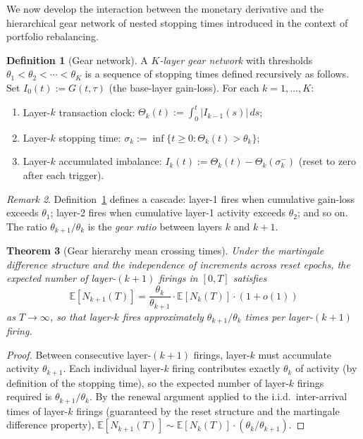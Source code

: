 \documentclass[twocolumn,11pt,a4paper]{article}
\theoremstyle{thmstyle}
\newtheorem{theorem}{Theorem}[section]
\theoremstyle{definition}
\newtheorem{definition}[theorem]{Definition}
\theoremstyle{remark}
\newtheorem{remark}[theorem]{Remark}
\newcommand{\Gain}{G}                        %
\newcommand{\Clock}{\Theta}                  %
\newcommand{\Expect}{\mathbb{E}}
\begin{document}
We now develop the interaction between the monetary
derivative and the hierarchical gear network of nested
stopping times introduced in the context of portfolio
rebalancing.

\begin{definition}[Gear network]\label{def:gear}
A \emph{$K$-layer gear network} with thresholds
$\theta_{1}<\theta_{2}<\cdots<\theta_{K}$ is a sequence
of stopping times defined recursively as follows.  Set
$I_{0}(t) := \Gain(t,\tau)$ (the base-layer gain-loss).
For each $k=1,\ldots,K$:
\begin{enumerate}[nosep,label=(\roman*)]
\item Layer-$k$ transaction clock:
$\Clock_{k}(t) := \int_{0}^{t}|I_{k-1}(s)|\,ds$;
\item Layer-$k$ stopping time:
$\sigma_{k} := \inf\{t\geq 0 : \Clock_{k}(t) > \theta_{k}\}$;
\item Layer-$k$ accumulated imbalance:
$I_{k}(t) := \Clock_{k}(t) - \Clock_{k}(\sigma_{k}^{-})$
(reset to zero after each trigger).
\end{enumerate}
\end{definition}

\begin{remark}\label{rem:gear-hierarchy}
Definition~\ref{def:gear} defines a cascade: layer-1 fires
when cumulative gain-loss exceeds $\theta_{1}$; layer-2
fires when cumulative layer-1 activity exceeds $\theta_{2}$;
and so on.  The ratio $\theta_{k+1}/\theta_{k}$ is the
\emph{gear ratio} between layers $k$ and $k+1$.
\end{remark}

\begin{theorem}[Gear hierarchy mean crossing times]
\label{thm:gear-crossing}
Under the martingale difference structure and the
independence of increments across reset epochs,
the expected number of layer-$(k+1)$ firings in $[0,T]$
satisfies
\begin{equation}\label{eq:gear-frequency}
  \Expect[N_{k+1}(T)] = \frac{\theta_{k}}{\theta_{k+1}}
                         \cdot\Expect[N_{k}(T)]
                         \cdot(1+o(1))
\end{equation}
as $T\to\infty$, so that layer-$k$ fires approximately
$\theta_{k+1}/\theta_{k}$ times per layer-$(k+1)$ firing.
\end{theorem}

\begin{proof}
Between consecutive layer-$(k+1)$ firings, layer-$k$ must
accumulate activity $\theta_{k+1}$.  Each individual
layer-$k$ firing contributes exactly $\theta_{k}$ of
activity (by definition of the stopping time), so the
expected number of layer-$k$ firings required is
$\theta_{k+1}/\theta_{k}$.  By the renewal argument
\citep{Feller1971} applied to the i.i.d.\ inter-arrival
times of layer-$k$ firings (guaranteed by the reset
structure and the martingale difference property),
$\Expect[N_{k+1}(T)]\sim \Expect[N_{k}(T)]\cdot
(\theta_{k}/\theta_{k+1})$.
\end{proof}
\end{document}
